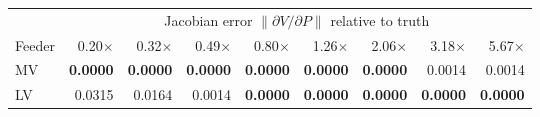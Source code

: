 \begin{tabular}{lrrrrrrrr}
\toprule
& \multicolumn{8}{c}{Jacobian error $\lVert\partial V/\partial P\rVert$ relative to truth} \\
\cmidrule(lr){2-9}
Feeder & 0.20$\times$ & 0.32$\times$ & 0.49$\times$ & 0.80$\times$ & 1.26$\times$ & 2.06$\times$ & 3.18$\times$ & 5.67$\times$ \\
\midrule
MV & \textbf{0.0000} & \textbf{0.0000} & \textbf{0.0000} & \textbf{0.0000} & \textbf{0.0000} & \textbf{0.0000} & 0.0014 & 0.0014 \\
LV & 0.0315 & 0.0164 & 0.0014 & \textbf{0.0000} & \textbf{0.0000} & \textbf{0.0000} & \textbf{0.0000} & \textbf{0.0000} \\
\bottomrule
\end{tabular}
